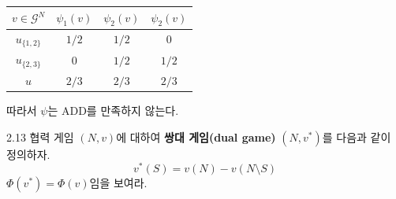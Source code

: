 \documentclass{article}
\numberwithin{equation}{section}
\begin{document}
\begin{sol}
\begin{enumerate}[(a)]
			\begin{table}[H]
				\centering
				\begin{tabular}{c|ccc}
					\toprule
					$v\in\mathcal G^N$ & $\psi_1(v)$ & $\psi_2(v)$ & $\psi_2(v)$\\
					\midrule
					$u_{\{1,2\}}$ & $1/2$ & $1/2$ & $0$\\
					$u_{\{2,3\}}$ & $0$ & $1/2$ & $1/2$\\
					$u$ & $2/3$ & $2/3$ & $2/3$\\
					\bottomrule
				\end{tabular}
			\end{table}
			따라서 $\psi$는 ADD를 만족하지 않는다.
	\end{enumerate}
\end{sol}

\begin{prob}{}{2.13}
	협력 게임 $(N,v)$에 대하여 \textbf{쌍대 게임(dual game)} $(N,v^*)$를 다음과 같이 정의하자.
	\[
		v^*(S)=v(N)-v(N\setminus S)
	\]
	$\Phi(v^*)=\Phi(v)$임을 보여라.
\end{prob}
\end{document}
